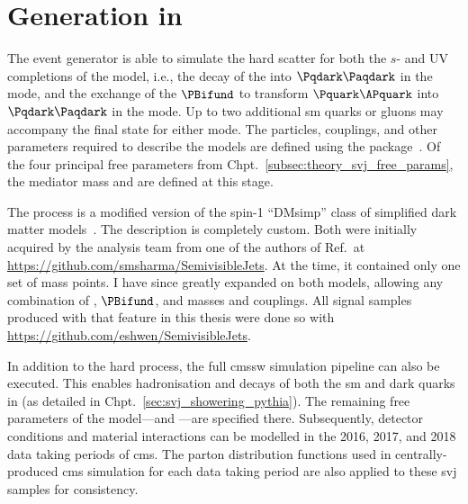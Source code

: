 

\section{Generation in \texorpdfstring{\MADGRAPH}{MadGraph}}
\label{sec:svj_signal_madgraph}

The \MADGRAPHFULL event generator is able to simulate the hard scatter for both the $s$- and \tchannel UV completions of the model, i.e., the decay of the \PZprime into $\Pqdark\Paqdark$ in the \schannel mode, and the exchange of the $\PBifund$ to transform $\Pquark\APquark$ into $\Pqdark\Paqdark$ in the \tchannel mode. Up to two additional \acrlong{sm} quarks or gluons may accompany the final state for either mode. The particles, couplings, and other parameters required to describe the models are defined using the \FEYNRULES package~\cite{Alloul:2013bka}. Of the four principal free parameters from Chpt.~\ref{subsec:theory_svj_free_params}, the mediator mass and \mqdark are defined at this stage.

The \schannel process is a modified version of the spin-1 ``DMsimp'' class of simplified dark matter models~\cite{Backovic:2015soa}. The \tchannel description is completely custom. Both were initially acquired by the analysis team from one of the authors of Ref.~at \url{https://github.com/smsharma/SemivisibleJets}. At the time, it contained only one set of mass points. I have since greatly expanded on both models, allowing any combination of \PZprime, $\PBifund$, and \Pqdark masses and couplings. All signal samples produced with \MADGRAPH that feature in this thesis were done so with \url{https://github.com/eshwen/SemivisibleJets}. %

In addition to the hard process, the full \acrshort{cmssw} simulation pipeline can also be executed. This enables hadronisation and decays of both the \acrshort{sm} and dark quarks in \PYTHIA (as detailed in Chpt.~\ref{sec:svj_showering_pythia}). The remaining free parameters of the model---\aDark and \rinv---are specified there. Subsequently, detector conditions and material interactions can be modelled in the 2016, 2017, and 2018 data taking periods of \acrshort{cms}. The parton distribution functions used in centrally-produced \acrshort{cms} simulation for each data taking period are also applied to these \gls{svj} samples for consistency.

